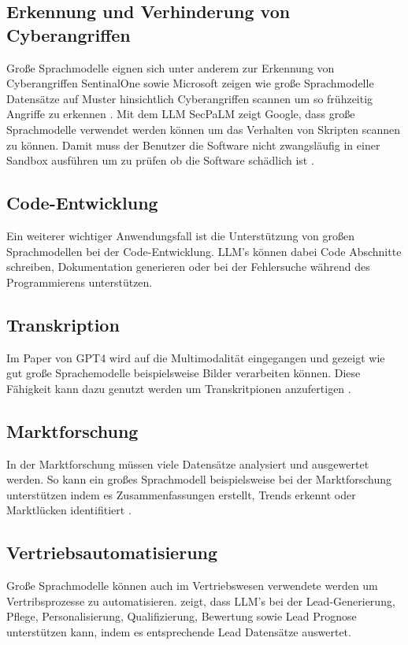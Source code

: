 \documentclass[conference]{IEEEtran}
\begin{document}
\subsection{Erkennung und Verhinderung von Cyberangriffen}
Große Sprachmodelle eignen sich unter anderem zur Erkennung von Cyberangriffen SentinalOne sowie Microsoft zeigen wie große Sprachmodelle Datensätze auf Muster hinsichtlich Cyberangriffen scannen um so frühzeitig Angriffe zu erkennen \cite{MicrosoftCopilotSecurity}\cite{SentinelOneUnveilsRevolutionary}.
Mit dem LLM SecPaLM zeigt Google, dass große Sprachmodelle verwendet werden können um das Verhalten von Skripten scannen zu können. Damit muss der Benutzer die Software nicht zwangsläufig in einer Sandbox ausführen um zu prüfen ob die Software schädlich ist \cite{keary12PraktischeLarge2023}.
\subsection{Code-Entwicklung}
Ein weiterer wichtiger Anwendungsfall ist die Unterstützung von großen Sprachmodellen bei der Code-Entwicklung. LLM's können dabei Code Abschnitte schreiben, Dokumentation generieren oder bei der Fehlersuche während des Programmierens unterstützen. \cite{keary12PraktischeLarge2023}
\subsection{Transkription}
Im Paper von GPT4 \cite{openaiGPT4TechnicalReport2024} wird auf die Multimodalität eingegangen und gezeigt wie gut große Sprachemodelle beispielsweise Bilder verarbeiten können. Diese Fähigkeit kann dazu genutzt werden um Transkritpionen anzufertigen \cite{keary12PraktischeLarge2023}.
\subsection{Marktforschung}
In der Marktforschung müssen viele Datensätze analysiert und ausgewertet werden. So kann ein großes Sprachmodell beispielsweise bei der Marktforschung unterstützen indem es Zusammenfassungen erstellt, Trends erkennt oder Marktlücken identifitiert \cite{keary12PraktischeLarge2023}.
\subsection{Vertriebsautomatisierung}
Große Sprachmodelle können auch im Vertriebswesen verwendete werden um Vertribsprozesse zu automatisieren. \cite{keary12PraktischeLarge2023} zeigt, dass LLM's bei der Lead-Generierung, Pflege, Personalisierung, Qualifizierung, Bewertung sowie Lead Prognose unterstützen kann, indem es entsprechende Lead Datensätze auswertet.
\end{document}
